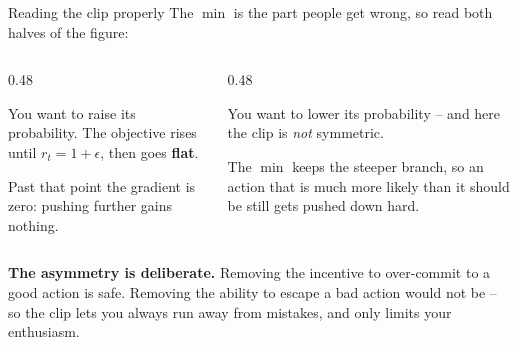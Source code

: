 \documentclass[aspectratio=169]{beamer}
\begin{document}
\begin{frame}{Reading the clip properly}
  \small
  The $\min$ is the part people get wrong, so read both halves of the figure:

  \vskip 6pt
  \begin{columns}[T]
    \begin{column}{0.48\textwidth}
      \begin{tcolorbox}[colback=paramgreen!8, colframe=paramgreen, boxrule=0.6pt, arc=2pt,
                        title={\textbf{Good action, $\hat{A} > 0$}}]
        \small
        You want to raise its probability. The objective rises until $r_t = 1+\epsilon$, then
        goes \textbf{flat}.

        \vskip 3pt
        Past that point the gradient is zero: pushing further gains nothing.
      \end{tcolorbox}
    \end{column}
    \begin{column}{0.48\textwidth}
      \begin{tcolorbox}[colback=armred!8, colframe=armred, boxrule=0.6pt, arc=2pt,
                        title={\textbf{Bad action, $\hat{A} < 0$}}]
        \small
        You want to lower its probability -- and here the clip is \emph{not} symmetric.

        \vskip 3pt
        The $\min$ keeps the steeper branch, so an action that is much more likely than it
        should be still gets pushed down hard.
      \end{tcolorbox}
    \end{column}
  \end{columns}

  \vskip 8pt
  \begin{tcolorbox}[colback=armblue!8, colframe=armblue, boxrule=0.6pt, arc=2pt]
    \small
    \textbf{The asymmetry is deliberate.} Removing the incentive to over-commit to a good action
    is safe. Removing the ability to escape a bad action would not be -- so the clip lets you
    always run away from mistakes, and only limits your enthusiasm.
  \end{tcolorbox}
\end{frame}
\end{document}
